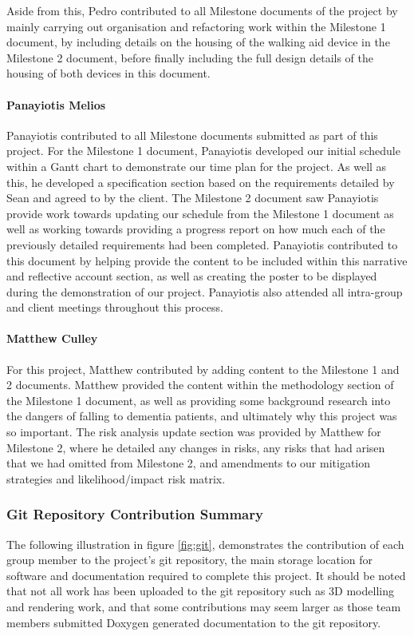                 Aside from this, Pedro contributed to all Milestone documents of the project by mainly carrying out organisation and refactoring work within the Milestone 1 document, by including details on the housing of the walking aid device in the Milestone 2 document, before finally including the full design details of the housing of both devices in this document.

                \paragraph{Panayiotis Melios}\mbox{}

                Panayiotis contributed to all Milestone documents submitted as part of this project. For the Milestone 1 document, Panayiotis developed our initial schedule within a Gantt chart to demonstrate our time plan for the project. As well as this, he developed a specification section based on the requirements detailed by Sean and agreed to by the client. The Milestone 2 document saw Panayiotis provide work towards updating our schedule from the Milestone 1 document as well as working towards providing a progress report on how much each of the previously detailed requirements had been completed. Panayiotis contributed to this document by helping provide the content to be included within this narrative and reflective account section, as well as creating the poster to be displayed during the demonstration of our project. Panayiotis also attended all intra-group and client meetings throughout this process. 

                \paragraph{Matthew Culley}\mbox{}

                For this project, Matthew contributed by adding content to the Milestone 1 and 2 documents. Matthew provided the content within the methodology section of the Milestone 1 document, as well as providing some background research into the dangers of falling to dementia patients, and ultimately why this project was so important. The risk analysis update section was provided by Matthew for Milestone 2, where he detailed any changes in risks, any risks that had arisen that we had omitted from Milestone 2, and amendments to our mitigation strategies and likelihood/impact risk matrix.

            \subsubsection{Git Repository Contribution Summary}

                The following illustration in figure \ref{fig:git}, demonstrates the contribution of each group member to the project's git repository, the main storage location for software and documentation required to complete this project. It should be noted that not all work has been uploaded to the git repository such as 3D modelling and rendering work, and that some contributions may seem larger as those team members submitted Doxygen generated documentation to the git repository.

                